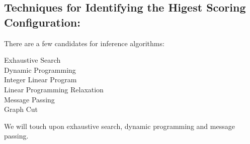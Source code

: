 \documentclass[../main.tex]{subfiles}
\begin{document}
    \subsection{Techniques for Identifying the Higest Scoring Configuration:}

    There are a few candidates for inference algorithms:

    \begin{outline}
    \1 Exhaustive Search \\
    \1 Dynamic Programming \\
    \1 Integer Linear Program \\
    \1 Linear Programming Relaxation \\
    \1 Message Passing \\
    \1 Graph Cut \\
    \end{outline}

    We will touch upon exhaustive search, dynamic programming and message passing.
\end{document}
